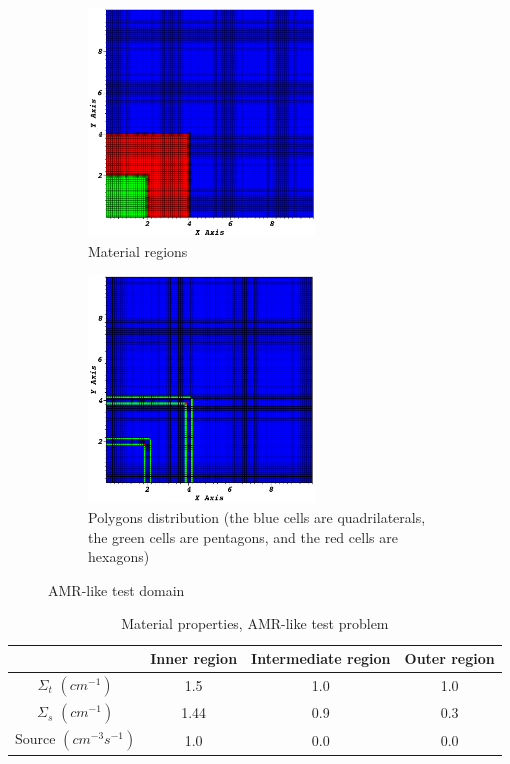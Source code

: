 \begin{figure}[!htbp]
  \centering
  \begin{subfigure}{0.75\textwidth}
    \centering
    \includegraphics[width=6cm]{zone_amr}
    \caption{Material regions}
  \end{subfigure}
  \begin{subfigure}{0.75\textwidth}
    \centering
    \includegraphics[width=6cm]{polygon_amr}
    \caption{Polygons distribution (the blue cells are quadrilaterals, the green cells are pentagons, and the red cells are hexagons)}
  \end{subfigure}
  \caption{AMR-like test domain}
\end{figure}
%
\begin{table}
  \begin{center}
    \caption{Material properties, AMR-like test problem}
    \begin{tabular}{|c|c|c|c|}
      \hline
      & Inner region & Intermediate region & Outer region  \\ \hline
    $\Sigma_t$ $(cm^{-1})$ & 1.5  & 1.0 & 1.0 \\
    $\Sigma_s$ $(cm^{-1})$ & 1.44 & 0.9 & 0.3 \\
  Source $(cm^{-3}s^{-1})$ & 1.0  & 0.0 & 0.0 \\
      \hline
    \end{tabular}
    \label{prop_amr}
  \end{center}
\end{table}

